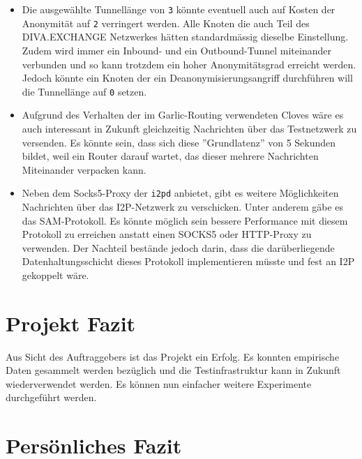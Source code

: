 \begin{itemize}
 \item Die ausgewählte Tunnellänge von \lstinline|3| könnte eventuell auch auf Kosten der Anonymität auf \lstinline|2| verringert werden. Alle Knoten die auch Teil des DIVA.EXCHANGE Netzwerkes hätten standardmässig dieselbe Einstellung.
Zudem wird immer ein Inbound- und ein Outbound-Tunnel miteinander verbunden und so kann trotzdem ein hoher Anonymitätsgrad erreicht werden.
Jedoch könnte ein Knoten der ein Deanonymisierungsangriff durchführen will die Tunnellänge auf \lstinline|0| setzen.
  \item Aufgrund des Verhalten der im Garlic-Routing verwendeten Cloves wäre es auch interessant in Zukunft gleichzeitig Nachrichten über das Testnetzwerk zu versenden. Es könnte sein, dass sich diese ''Grundlatenz'' von 5 Sekunden bildet, weil ein Router darauf wartet, das dieser mehrere Nachrichten Miteinander verpacken kann.
  \item Neben dem Socks5-Proxy der \lstinline|i2pd| anbietet, gibt es weitere Möglichkeiten Nachrichten über das I2P-Netzwerk zu verschicken.
    Unter anderem gäbe es das SAM-Protokoll. Es könnte möglich sein bessere Performance mit diesem Protokoll zu erreichen anstatt einen SOCKS5 oder HTTP-Proxy zu verwenden. \cite{noauthor_sam_nodate}
    Der Nachteil bestände jedoch darin, dass die darüberliegende Datenhaltungsschicht dieses Protokoll implementieren müsste und fest an I2P gekoppelt wäre.
\end{itemize}


\section{Projekt Fazit}

Aus Sicht des Auftraggebers ist das Projekt ein Erfolg. Es konnten empirische Daten gesammelt werden bezüglich und die Testinfrastruktur kann in Zukunft wiederverwendet werden. Es können nun einfacher weitere Experimente durchgeführt werden.


\section{Persönliches Fazit}


